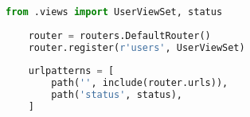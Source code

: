 \begin{lstlisting}[language=Python,caption={Fragment of Django route configuration file - app/urls.py},breaklines=true,label={lst:djangoUrlsApp}]
    from .views import UserViewSet, status
    
    router = routers.DefaultRouter()
    router.register(r'users', UserViewSet)
    
    urlpatterns = [
        path('', include(router.urls)),
        path('status', status),
    ]
\end{lstlisting}
